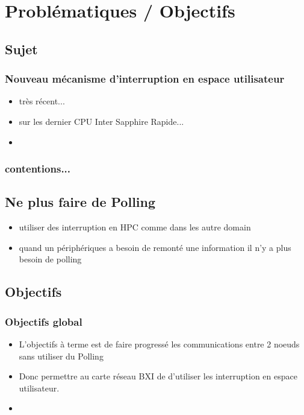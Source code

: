 \section{Problématiques / Objectifs} %

\subsection{Sujet}

\subsubsection{Nouveau mécanisme d'interruption en espace utilisateur}

\begin{itemize}
  \item très récent...
  \item sur les dernier CPU Inter Sapphire Rapide...
  \item 
\end{itemize}

\subsubsection{contentions...}

\subsection{Ne plus faire de Polling}

\begin{itemize}
  \item utiliser des interruption en HPC comme dans les autre domain
  \item quand un périphériques a besoin de remonté une information il n'y a plus besoin de polling
\end{itemize}

\subsection{Objectifs}

\subsubsection{Objectifs global}

\begin{itemize}
  \item L'objectifs à terme est de faire progressé les communications entre 2 noeuds sans utiliser du Polling
  \item Donc permettre au carte réseau BXI de d'utiliser les interruption en espace utilisateur.
  \item 
\end{itemize}

